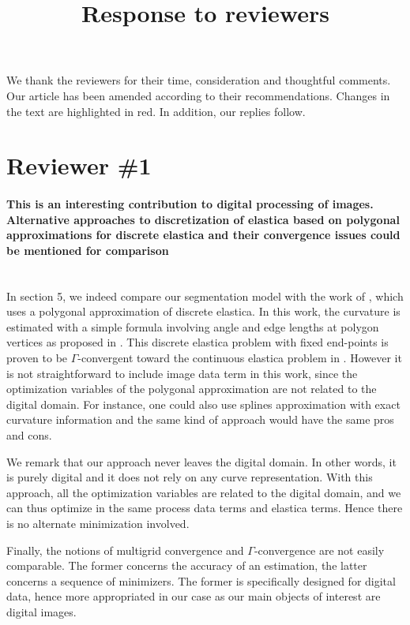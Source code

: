 \documentclass[12pt]{article}
\title{Response to reviewers}
\date{}
\begin{document}
\maketitle

We thank the reviewers for their time, consideration and thoughtful comments. Our article has been amended
according to their recommendations. Changes in the text are highlighted in red. In addition, our replies follow.

\section{Reviewer \#1}

\paragraph{This is an interesting contribution to digital processing of images. Alternative approaches to discretization of elastica based on polygonal approximations for discrete elastica and their convergence issues could be mentioned for comparison}

~\\ In section 5, we indeed compare our segmentation model with the
work of \cite{schoenemann09linear}, which uses a polygonal
approximation of discrete elastica. In this work, the curvature is
estimated with a simple formula involving angle and edge lengths at
polygon vertices as proposed in \cite{bruckstein96}. This discrete
elastica problem with fixed end-points is proven to be
$\Gamma$-convergent toward the continuous elastica problem in
\cite{bruckstein01}. However it is not straightforward to include
image data term in this work, since the optimization variables of the
polygonal approximation are not related to the digital domain. For
instance, one could also use splines approximation with exact
curvature information and the same kind of approach would have the
same pros and cons.

We remark that our approach never leaves the digital domain. In other
words, it is purely digital and it does not rely on any curve
representation. With this approach, all the optimization variables are
related to the digital domain, and we can thus optimize in the same
process data terms and elastica terms. Hence there is no alternate
minimization involved.

Finally, the notions of multigrid convergence and $\Gamma$-convergence
are not easily comparable. The former concerns the accuracy of an
estimation, the latter concerns a sequence of minimizers. The former
is specifically designed for digital data, hence more appropriated in
our case as our main objects of interest are digital images.  ~\\
\end{document}
